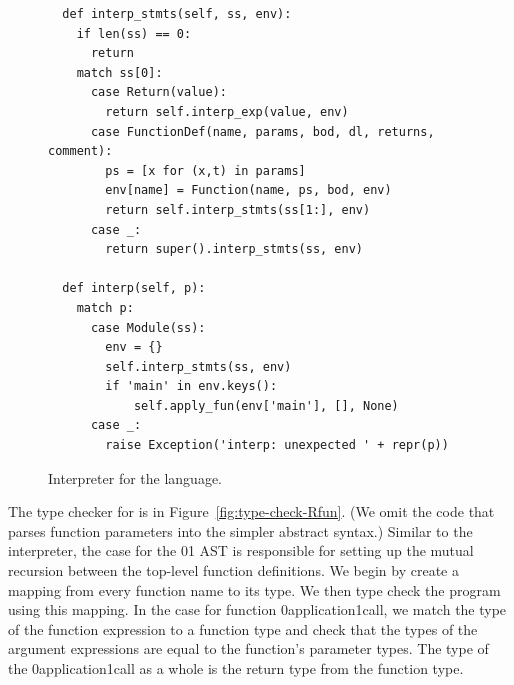 \documentclass[7x10,nocrop]{TimesAPriori_MIT}%
\def\racketEd{0}
\def\pythonEd{1}
\def\edition{0}
\newcommand{\racket}[1]{{\if\edition\racketEd{#1}\fi}}
\newcommand{\python}[1]{{\if\edition\pythonEd #1\fi}}
\begin{document}
\begin{figure}[tp]
{\begin{lstlisting}
  def interp_stmts(self, ss, env):
    if len(ss) == 0:
      return
    match ss[0]:
      case Return(value):
        return self.interp_exp(value, env)
      case FunctionDef(name, params, bod, dl, returns, comment):
        ps = [x for (x,t) in params]
        env[name] = Function(name, ps, bod, env)
        return self.interp_stmts(ss[1:], env)
      case _:
        return super().interp_stmts(ss, env)
    
  def interp(self, p):
    match p:
      case Module(ss):
        env = {}
        self.interp_stmts(ss, env)
        if 'main' in env.keys():
            self.apply_fun(env['main'], [], None)
      case _:
        raise Exception('interp: unexpected ' + repr(p))
\end{lstlisting}
\fi}
\caption{Interpreter for the \LangFun{} language.}
\label{fig:interp-Rfun}
\end{figure}



The type checker for \LangFun{} is in
Figure~\ref{fig:type-check-Rfun}.  (We omit the code that parses
function parameters into the simpler abstract syntax.)  Similar to the
interpreter, the case for the
\racket{}\python{}
%
AST is responsible for setting up the mutual recursion between the
top-level function definitions. We begin by create a mapping
 from every function name to its type. We then type check
the program using this mapping.
%
In the case for function \racket{application}\python{call}, we match
the type of the function expression to a function type and check that
the types of the argument expressions are equal to the function's
parameter types. The type of the \racket{application}\python{call} as
a whole is the return type from the function type.
\end{document}
